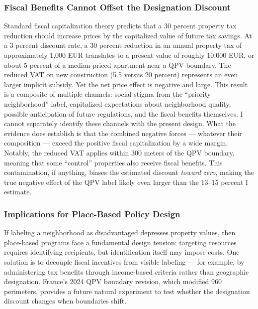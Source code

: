 \documentclass[12pt]{article}
\begin{document}
\subsubsection*{Fiscal Benefits Cannot Offset the Designation Discount} Standard fiscal capitalization theory predicts that a 30 percent property tax reduction should increase prices by the capitalized value of future tax savings. At a 3 percent discount rate, a 30 percent reduction in an annual property tax of approximately 1,000 EUR translates to a present value of roughly 10,000 EUR, or about 5 percent of a median-priced apartment near a QPV boundary. The reduced VAT on new construction (5.5 versus 20 percent) represents an even larger implicit subsidy. Yet the net price effect is negative and large. This result is a composite of multiple channels: social stigma from the ``priority neighborhood'' label, capitalized expectations about neighborhood quality, possible anticipation of future regulations, and the fiscal benefits themselves. I cannot separately identify these channels with the present design. What the evidence does establish is that the combined negative forces --- whatever their composition --- exceed the positive fiscal capitalization by a wide margin. Notably, the reduced VAT applies within 300 meters of the QPV boundary, meaning that some ``control'' properties also receive fiscal benefits. This contamination, if anything, biases the estimated discount \textit{toward zero}, making the true negative effect of the QPV label likely even larger than the 13--15 percent I estimate.

\subsubsection*{Implications for Place-Based Policy Design} If labeling a neighborhood as disadvantaged depresses property values, then place-based programs face a fundamental design tension: targeting resources requires identifying recipients, but identification itself may impose costs. One solution is to decouple fiscal incentives from visible labeling --- for example, by administering tax benefits through income-based criteria rather than geographic designation. France's 2024 QPV boundary revision, which modified 960 perimeters, provides a future natural experiment to test whether the designation discount changes when boundaries shift.
\end{document}
